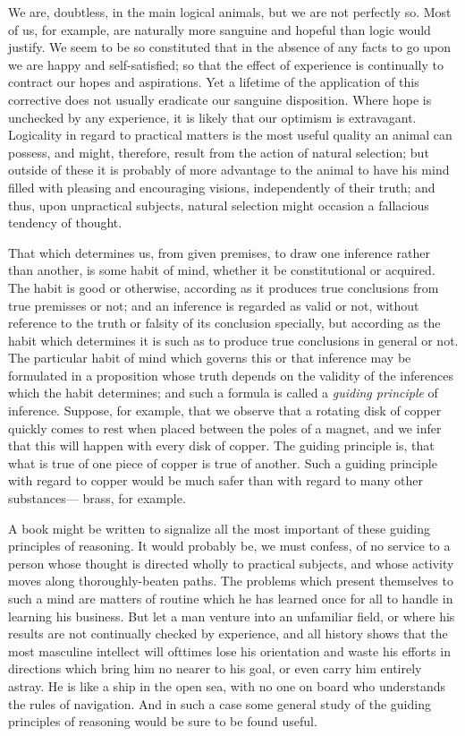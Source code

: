 We are, doubtless, in the main logical animals, but we are not perfectly so. Most of us, for example, are naturally more sanguine and hopeful than logic would justify. We seem to be so constituted that in the absence of any facts to go upon we are happy and self-satisfied; so that the effect of experience is continually to contract our hopes and aspirations. Yet a lifetime of the application of this corrective does not usually eradicate our sanguine disposition. Where hope is unchecked by any experience, it is likely that our optimism is extravagant. Logicality in regard to practical matters is the most useful quality an animal can possess, and might, therefore, result from the action of natural selection; but outside of these it is probably of more advantage to the animal to have his mind filled with pleasing and encouraging visions, independently of their truth; and thus, upon unpractical subjects, natural selection might occasion a fallacious tendency of thought.


That which determines us, from given premises, to draw one inference rather than another, is some habit of mind, whether it be constitutional or acquired. The habit is good or otherwise, according as it produces true conclusions from true premisses or not; and an inference is regarded as valid or not, without reference to the truth or falsity of its conclusion specially, but according as the habit which determines it is such as to produce true conclusions in general or not. The particular habit of mind which governs this or that inference may be formulated in a proposition whose truth depends on the validity of the inferences which the habit determines; and such a formula is called a \emph{guiding principle} of inference. Suppose, for example, that we observe that a rotating disk of copper quickly comes to rest when placed between the poles of a magnet, and we infer that this will happen with every disk of copper. The guiding principle is, that what is true of one piece of copper is true of another. Such a guiding principle with regard to copper would be much safer than with regard to many other substances--- brass, for example.


A book might be written to signalize all the most important of these guiding principles of reasoning. It would probably be, we must confess, of no service to a person whose thought is directed wholly to practical subjects, and whose activity moves along thoroughly-beaten paths. The problems which present themselves to such a mind are matters of routine which he has learned once for all to handle in learning his business. But let a man venture into an unfamiliar field, or where his results are not continually checked by experience, and all history shows that the most masculine intellect will ofttimes lose his orientation and waste his efforts in directions which bring him no nearer to his goal, or even carry him entirely astray. He is like a ship in the open sea, with no one on board who understands the rules of navigation. And in such a case some general study of the guiding principles of reasoning would be sure to be found useful.

